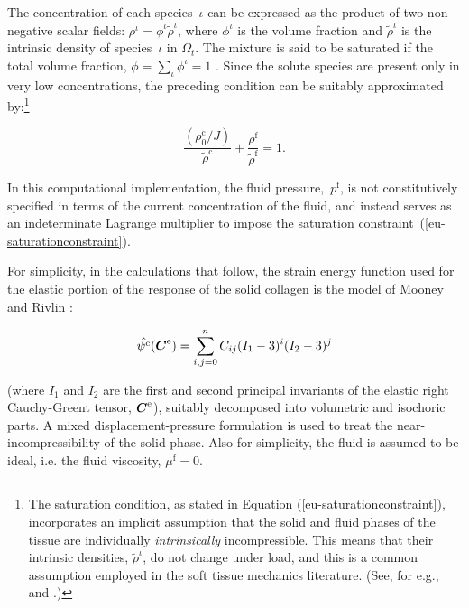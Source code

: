 The concentration of each species~$\iota$ can be expressed as the
product of two non-negative scalar fields: $\rho^\iota = \phi^\iota
\tilde{\rho}^\iota$, where $\phi^\iota$ is the volume fraction and
$\tilde{\rho}^\iota$ is the intrinsic density of species~$\iota$ in
$\Omega_{t}$. The mixture is said to be saturated if the total volume
fraction, \mbox{$\phi = \sum\limits_{\iota}\phi^\iota = 1$}
\citep{passmanetal}. Since the solute species are present only in very
low concentrations, the preceding condition can be suitably
approximated by:\footnote{The saturation condition, as stated in
  Equation (\ref{eu-saturationconstraint}), incorporates an implicit
  assumption that the solid and fluid phases of the tissue are
  individually {\em intrinsically} incompressible. This means that
  their intrinsic densities, $\tilde{\rho}^\iota$, do not change under
  load, and this is a common assumption employed in the soft tissue
  mechanics literature. (See, for e.g., \citet{mowetal1980} and
  \citet{ateshian07}.)}

\begin{equation}
\frac{\left(\rho_{0}^{\mathrm{c}}/J\right)}
     {\tilde{\rho}^{\mathrm{c}}} +
     \frac{\rho^{\mathrm{f}}}{\tilde{\rho}^{\mathrm{f}}} = 1.
\label{eu-saturationconstraint}
\end{equation}

\noindent In this computational implementation, the fluid
pressure,~$p^{\mathrm{f}}$, is not constitutively specified in terms
of the current concentration of the fluid, and instead serves as an
indeterminate Lagrange multiplier to impose the saturation
constraint~(\ref{eu-saturationconstraint}).

For simplicity, in the calculations that follow, the strain energy
function used for the elastic portion of the response of the solid
collagen is the model of Mooney and Rivlin \citep{mooney1940}:

\begin{equation}
\hat{\psi^{\mathrm{c}}} (\mbox{\boldmath$ C$}^{\mathrm{e}}) = \sum\limits_{i,j=0}^{n}
C_{ij} (I_{1}-3)^{i} (I_{2}-3)^{j}
\label{mooney-rivlin-model}
\end{equation}

\noindent (where $I_{1}$ and $I_{2}$ are the first and second
principal invariants of the elastic right Cauchy-Greent tensor,
$\mbox{\boldmath$ C$}^{\mathrm{e}}$), suitably decomposed into volumetric and isochoric
parts. A mixed displacement-pressure \citep{ZienkTay:89} formulation
is used to treat the near-incompressibility of the solid phase. Also
for simplicity, the fluid is assumed to be ideal, i.e. the fluid
viscosity, $\mu^{\mathrm{f}}=0$.

